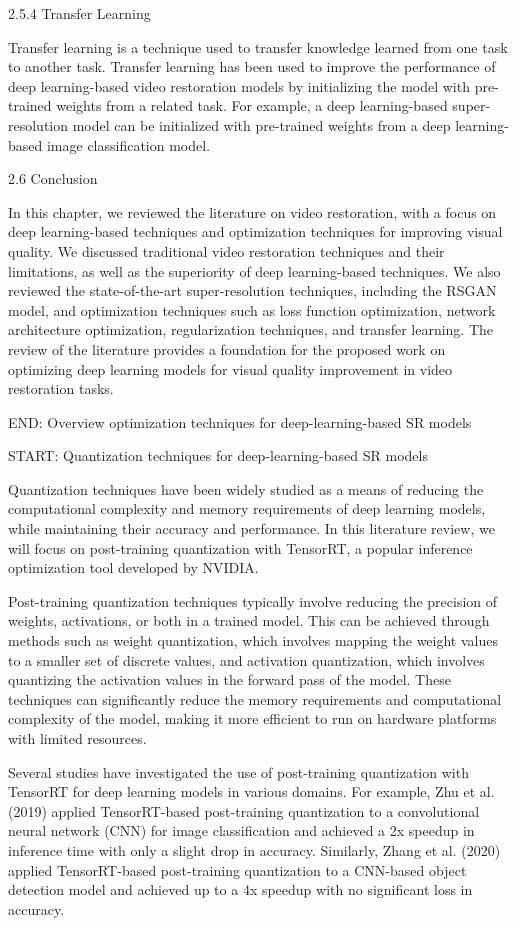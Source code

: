 2.5.4 Transfer Learning

Transfer learning is a technique used to transfer knowledge learned from one task to another task. Transfer learning has been used to improve the performance of deep learning-based video restoration models by initializing the model with pre-trained weights from a related task. For example, a deep learning-based super-resolution model can be initialized with pre-trained weights from a deep learning-based image classification model.

2.6 Conclusion

In this chapter, we reviewed the literature on video restoration, with a focus on deep learning-based techniques and optimization techniques for improving visual quality. We discussed traditional video restoration techniques and their limitations, as well as the superiority of deep learning-based techniques. We also reviewed the state-of-the-art super-resolution techniques, including the RSGAN model, and optimization techniques such as loss function optimization, network architecture optimization, regularization techniques, and transfer learning. The review of the literature provides a foundation for the proposed work on optimizing deep learning models for visual quality improvement in video restoration tasks.

END: Overview optimization techniques for deep-learning-based SR models

START: Quantization techniques for deep-learning-based SR models

Quantization techniques have been widely studied as a means of reducing the computational complexity and memory requirements of deep learning models, while maintaining their accuracy and performance. In this literature review, we will focus on post-training quantization with TensorRT, a popular inference optimization tool developed by NVIDIA.

Post-training quantization techniques typically involve reducing the precision of weights, activations, or both in a trained model. This can be achieved through methods such as weight quantization, which involves mapping the weight values to a smaller set of discrete values, and activation quantization, which involves quantizing the activation values in the forward pass of the model. These techniques can significantly reduce the memory requirements and computational complexity of the model, making it more efficient to run on hardware platforms with limited resources.

Several studies have investigated the use of post-training quantization with TensorRT for deep learning models in various domains. For example, Zhu et al. (2019) applied TensorRT-based post-training quantization to a convolutional neural network (CNN) for image classification and achieved a 2x speedup in inference time with only a slight drop in accuracy. Similarly, Zhang et al. (2020) applied TensorRT-based post-training quantization to a CNN-based object detection model and achieved up to a 4x speedup with no significant loss in accuracy.

